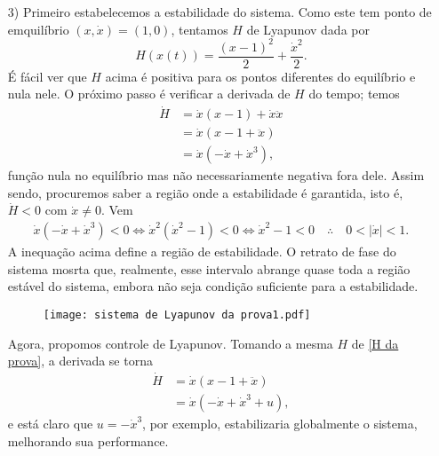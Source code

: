 \begin{enumerate}
		\item [3)]
		Primeiro estabelecemos a estabilidade do sistema. Como este tem ponto de emquilíbrio $(x, \dot{x}) = (1, 0)$, tentamos $H$ de Lyapunov dada por 
		\begin{equation}
			H(x(t)) = \frac{(x-1)^2}{2} + \frac{\dot{x}^2}{2}.
			\label{H da prova}
		\end{equation}
		É fácil ver que $H$ acima é positiva para os pontos diferentes do equilíbrio e nula nele.
		O próximo passo é verificar a derivada de $H$ do tempo; temos
		\begin{align*}
			\dot{H} &= \dot{x}(x-1) + \dot{x}\ddot{x} \\
			        &= \dot{x}(x-1+\ddot{x}) \\
			        &= \dot{x}(-\dot{x}+\dot{x}^3),
		\end{align*}
		função nula no equilíbrio mas não necessariamente negativa fora dele. 
		Assim sendo, procuremos saber a região onde a estabilidade é garantida, isto é, $\dot{H}<0$ com $\dot{x}\neq 0$. 
		Vem
		\begin{align*}
			\dot{x}(-\dot{x}+\dot{x}^3) < 0 \iff
			\dot{x}^2(\dot{x}^2-1) < 0      \iff
			\dot{x}^2-1 < 0                 \quad\therefore\quad
			0<|\dot{x}|<1.
		\end{align*}
		A inequação acima define a região de estabilidade. 
		O retrato de fase do sistema mosrta que, realmente, esse intervalo abrange quase toda a região estável do sistema, embora não seja condição suficiente para a estabilidade.
		\begin{figure}[H]\centering
			\texttt{[image: sistema de Lyapunov da prova1.pdf]}
		\end{figure}
		Agora, propomos controle de Lyapunov. Tomando a mesma $H$ de \eqref{H da prova}, a derivada se torna 
		\begin{align*}
			\dot{H} &= \dot{x}(x - 1 + \ddot{x}) \\
			        &= \dot{x}(-\dot{x} + \dot{x}^3 + u),
		\end{align*}
		e está claro que $u=-\dot{x}^3$, por exemplo, estabilizaria globalmente o sistema, melhorando sua performance.
	\end{enumerate}



















